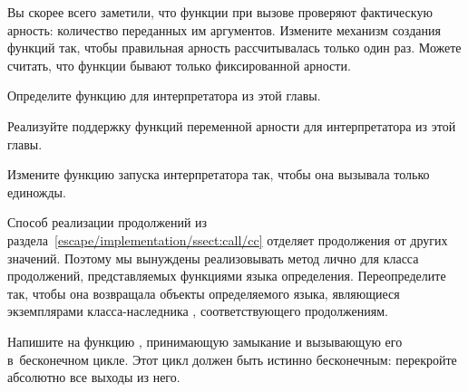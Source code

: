 \begin{exercise}\label{escape/ex:arity-optimize}
Вы скорее всего заметили, что функции при вызове проверяют фактическую арность:
количество переданных им аргументов. Измените механизм создания функций так,
чтобы правильная арность рассчитывалась только один раз. Можете считать, что
функции бывают только фиксированной арности.
\end{exercise}


\begin{exercise}\label{escape/ex:apply}
Определите функцию  для интерпретатора из этой главы.
\end{exercise}


\begin{exercise}\label{escape/ex:dotted}
Реализуйте поддержку функций переменной арности для интерпретатора из этой
главы.
\end{exercise}


\begin{exercise}\label{escape/ex:evaluate}
Измените функцию запуска интерпретатора так, чтобы она вызывала 
только единожды.
\end{exercise}


\begin{exercise}\label{escape/ex:cc-value}
Способ реализации продолжений из
раздела~\ref{escape/implementation/ssect:call/cc} отделяет продолжения от других
значений. Поэтому мы вынуждены реализовывать метод  лично для класса
продолжений, представляемых функциями языка определения. Переопределите
 так, чтобы она возвращала объекты определяемого языка, являющиеся
экземплярами класса-наследника , соответствующего продолжениям.
\end{exercise}


\begin{exercise}\label{escape/ex:eternal}
Напишите на {\CommonLisp} функцию , принимающую замыкание и
вызывающую его в~бесконечном цикле. Этот цикл должен быть истинно бесконечным:
перекройте абсолютно все выходы из него.
\end{exercise}


